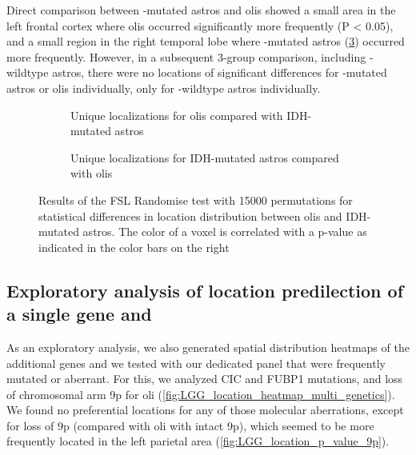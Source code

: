 Direct comparison between -mutated \glspl{astro} and \glspl{oli} showed a small area in the left frontal cortex where \glspl{oli} occurred significantly more frequently (P \num{< 0.05}), and a small region in the right temporal lobe where -mutated \glspl{astro} (\cref{fig:LGG_location_oligo_astro_p_value}) occurred more frequently.
However, in a subsequent 3-group comparison, including -wildtype \glspl{astro}, there were no locations of significant differences for -mutated \glspl{astro} or \glspl{oli} individually, only for -wildtype \glspl{astro} individually.

\begin{figure}[htbp]
    \centering
    \begin{subfigure}[b]{\textwidth}
        \caption{Unique localizations for \glspl{oli} compared with \acrshort{IDH}-mutated \glspl{astro}}\label{fig:LGG_location_p_values_1p19q_codeleted_vs_intact_codeleted}
    \end{subfigure}
    \begin{subfigure}[b]{\textwidth}
        \caption{Unique localizations for \acrshort{IDH}-mutated \glspl{astro} compared with \glspl{oli}}\label{fig:LGG_location_p_values_1p19q_codeleted_vs_intact_intact}
    \end{subfigure}
    \caption{Results of the \acrshort{FSL} Randomise test with \num{15000} permutations for statistical differences in location distribution between \glspl{oli} and \acrshort{IDH}-mutated \glspl{astro}.
    The color of a voxel is correlated with a p-value as indicated in the color bars on the right}\label{fig:LGG_location_oligo_astro_p_value}
\end{figure}

\subsection{Exploratory analysis of location predilection of a single gene and }

As an exploratory analysis, we also generated spatial distribution heatmaps of the additional genes and  we tested with our dedicated  panel that were frequently mutated or aberrant.
For this, we analyzed CIC and FUBP1 mutations, and loss of chromosomal arm 9p for \gls{oli} (\cref{fig:LGG_location_heatmap_multi_genetics}).
We found no preferential locations for any of those molecular aberrations, except for loss of 9p (compared with \gls{oli} with intact 9p), which seemed to be more frequently located in the left parietal area (\cref{fig:LGG_location_p_value_9p}).

